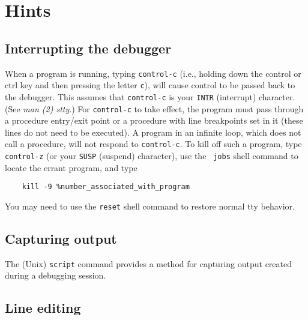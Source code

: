 \section{Hints}

\subsection{Interrupting the debugger}

When a program is running, typing {\tt control-c} (i.e., holding down
the control or ctrl key and then pressing the letter {\tt c}), will
cause control to be passed back to the debugger.  This assumes that
{\tt control-c} is your {\tt INTR} (interrupt) character. (See {\em
man (2) stty}.)  For {\tt control-c} to take effect, the program must
pass through a procedure entry/exit point or a procedure with line
breakpoints set in it (these lines do not need to be executed).  A
program in an infinite loop, which does not call a procedure, will not
respond to {\tt control-c}.  To kill off such a program, type {\tt
control-z} (or your {\tt SUSP} (suspend) character), use the {\tt
jobs} shell command to locate the errant program, and type
\begin{verbatim}
    kill -9 %number_associated_with_program
\end{verbatim}
You may need to use the {\tt reset} shell command to restore normal
tty behavior.

\subsection{Capturing output}

The (Unix) {\tt script} command provides a method for capturing output
created during a debugging session.

\subsection{Line editing}

